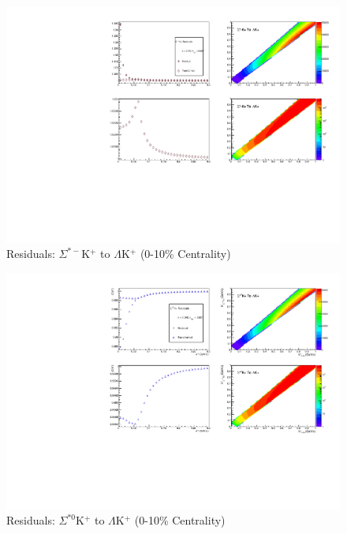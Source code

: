 \documentclass[../AnalysisNoteJBuxton.tex]{subfiles}
\begin{document}
\begin{figure}[h]
  \centering
  \includegraphics[width=\textwidth]{9_AdditionalFigures/Figures/Residuals/LamKchP/Residuals_LamKchP_0010_SigStMKchP_MomResCrctn_NonFlatBgdCrctn_ResidualsIncluded_UsingCoulombOnlyInterpCfs.pdf}
  \caption[Residuals: $\Sigma^{*-}$K$^{+}$ to $\Lambda$K$^{+}$ (0-10\% Centrality)]{Residuals: $\Sigma^{*-}$K$^{+}$ to $\Lambda$K$^{+}$ (0-10\% Centrality)}
  \label{fig:Res_LamKchP_0010_SigStMKchP}
\end{figure}

\begin{figure}[h]
  \centering
  \includegraphics[width=\textwidth]{9_AdditionalFigures/Figures/Residuals/LamKchP/Residuals_LamKchP_0010_SigSt0KchP_MomResCrctn_NonFlatBgdCrctn_ResidualsIncluded_UsingCoulombOnlyInterpCfs.pdf}
  \caption[Residuals: $\Sigma^{*0}$K$^{+}$ to $\Lambda$K$^{+}$ (0-10\% Centrality)]{Residuals: $\Sigma^{*0}$K$^{+}$ to $\Lambda$K$^{+}$ (0-10\% Centrality)}
  \label{fig:Res_LamKchP_0010_SigSt0KchP}
\end{figure}
\end{document}
